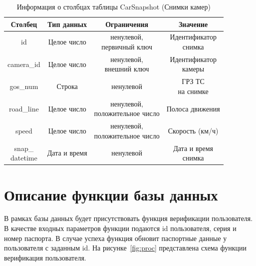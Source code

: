 
\begin{table}[H]
    \begin{center}
        \caption{Информация о столбцах таблицы CarSnapshot (Снимки камер)}
        \begin{tabular}{|c|c|c|c|}
            \hline
            Столбец & Тип данных & Ограничения & Значение \\
            \hline
            id & Целое число & \makecell{ненулевой, \\ первичный ключ} & \makecell{Идентификатор \\ снимка} \\
            \hline
            camera\_id & Целое число & \makecell{ненулевой, \\ внешний ключ} & \makecell{Идентификатор \\ камеры} \\
            \hline
            gos\_num & Строка & ненулевой & \makecell{ГРЗ ТС \\ на снимке} \\
            \hline
            road\_line & Целое число & \makecell{ненулевой, \\ положительное число} & Полоса движения \\
            \hline
            speed & Целое число & \makecell{ненулевой, \\ положительное число} & Скорость (км/ч) \\
            \hline
            \makecell{snap\_ \\ datetime} & Дата и время & ненулевой & \makecell{Дата и время \\ снимка} \\
            \hline
        \end{tabular}
        \label{table:db:car_snapshot}
    \end{center}
\end{table}

\section{Описание функции базы данных}

В рамках базы данных будет присутствовать функция верификации пользователя. В качестве входных параметров функции подаются id пользователя, серия и номер паспорта. В случае успеха функция обновит паспортные данные у пользователя с заданным id. На рисунке~\ref{fig:proc} представлена схема функции
верификация пользователя.

